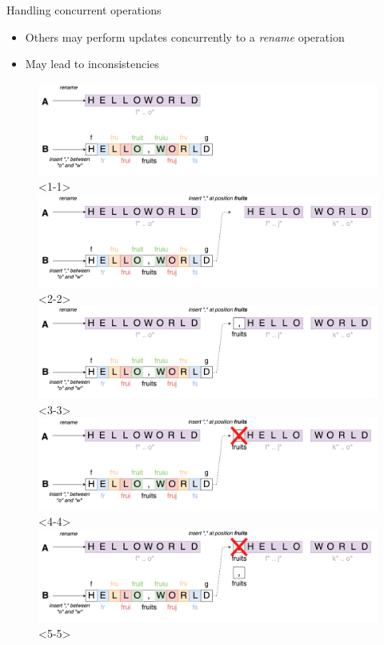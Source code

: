 \documentclass[10pt]{beamer}
\begin{document}
\begin{frame}{Handling concurrent operations}
  \begin{itemize}
    \item Others may perform updates concurrently to a \emph{rename} operation
    \item<4-> May lead to inconsistencies
  \end{itemize}
  \begin{figure}
    \includegraphics[scale=0.09]{img/concurrent-insert-rename-1.png}<1-1>
    \includegraphics[scale=0.09]{img/concurrent-insert-rename-2.png}<2-2>
    \includegraphics[scale=0.09]{img/concurrent-insert-rename-3.png}<3-3>
    \includegraphics[scale=0.09]{img/concurrent-insert-rename-4.png}<4-4>
    \includegraphics[scale=0.09]{img/concurrent-insert-rename-5.png}<5-5>

\end{figure}
\end{frame}
\end{document}

